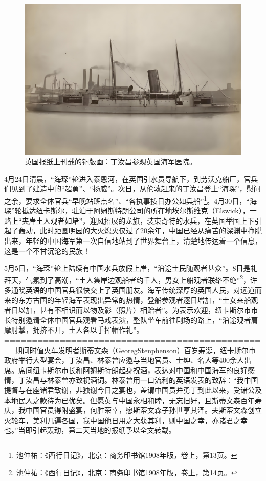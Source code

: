 \documentclass[12pt,UTF8]{ctexbook}
\begin{document}
\begin{figure}[htbp]
	\centering
	\includegraphics[width=1\linewidth]{Images/30}
	\caption{英国报纸上刊载的铜版画：丁汝昌参观英国海军医院。}
	\label{fig:1}
\end{figure}

4月24日清晨，“海琛”轮进入泰恩河，在英国引水员导航下，到劳沃克船厂，官兵们见到了建造中的“超勇”、“扬威”。次日，从伦敦赶来的丁汝昌登上“海琛”，慰问之余，要求全体官兵“早晚站班点名”、“各执事按日办公如兵船”\footnote{池仲祐：《西行日记》，北京：商务印书馆1908年版，卷上，第13页。}。4月30日，“海琛”轮抵达纽卡斯尔，驻泊于阿姆斯特朗公司的所在地埃尔斯维克（Elswick），一路上“夹岸土人观者如堵”，迎风招展的龙旗，装束奇特的水兵，在英国举国上下引起了轰动，此时距圆明园的大火熄灭仅过了20余年，中国已经从痛苦的深渊中挣脱出来，年轻的中国海军第一次自信地站到了世界舞台上，清楚地传达着一个信息，这是一个不甘沉沦的民族！

5月5日，“海琛”轮上陆续有中国水兵放假上岸，“沿途土民随观者甚众”。8日是礼拜天，气氛到了高潮，“土人集岸边观船者约千人，男女上船观者联络不绝”\footnote{池仲祐：《西行日记》，北京：商务印书馆1908年版，卷上，第14页。}，许多通晓英语的中国官兵很快交上了英国朋友。海军传统深厚的英国人民，对远道而来的东方古国的年轻海军表现出异常的热情，登船参观者逐日增加，“士女来船观者日以加，甚有不相识而以物及影（照片）相赠者”。为表示欢迎，纽卡斯尔市市长特别邀请全体中国官兵观看马戏表演，整队坐车前往剧场的路上，“沿途观者肩摩肘掣，拥挤不开，土人各以手挥帽作礼”。================================================期间时值火车发明者斯蒂文森（GeoregStenphenson）百岁寿诞，纽卡斯尔市政府举行大型宴会，丁汝昌、林泰曾应邀与当地官员、士绅、名人等400余人出席。席间纽卡斯尔市长和阿姆斯特朗起身祝酒，表达对中国和中国海军的良好感情，丁汝昌与林泰曾亦致祝酒词。林泰曾用一口流利的英语发表的致辞：“我中国提督与在座诸君致谢，非独谢今日之宴也，盖谓中国员弁勇丁到此以来，受诸公及本地民人之款待为已优矣。但愿英与中国永相和睦，无忘旧好，且斯蒂文森百年寿庆，我中国官员得附盛宴，何胜荣幸，愿斯蒂文森子孙世享其泽。夫斯蒂文森创立火轮车，美利几遍各国，我中国他日用之大获其利，则中国之幸，亦诸君之幸也。”当即引起轰动，第二天当地的报纸予以全文转载。
\end{document}
